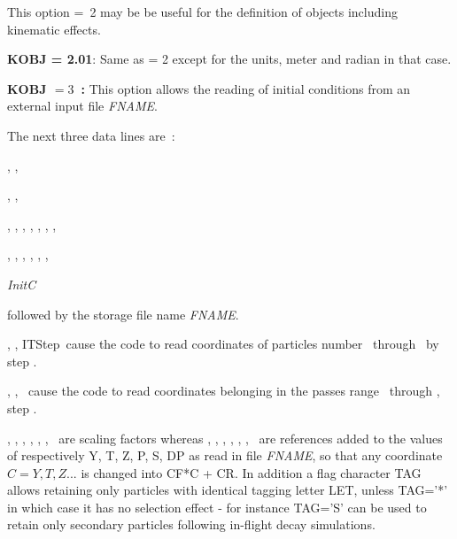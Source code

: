 \smallskip

\noindent This option \mbox{\KOBJ= 2}   may be be useful for the definition of objects including kinematic  effects.  



\bigskip

\noindent\textbf{KOBJ = 2.01}: Same as \KOBJ = 2    except for the units, meter and radian in that case. 




\bigskip




\noindent\textbf{KOBJ $= 3$~:} This option allows the reading of initial conditions from an
external input file \textsl{FNAME}.  

\noindent The next three data lines are~: 

\smallskip 

\ITone, \ITtwo, \ITStep

\IPone, \IPtwo, \IPStep

\YF, \TF, \ZF, \PF, \SF, \DPF, \TiF, \TAG      {} 

\YR, \TR, \ZR, \PR, \SR, \DPR, \TiR

\textsl{InitC}

\smallskip 

\noindent followed by the storage file name \textsl{FNAME}. 

\smallskip 

\noindent \ITone, \ITtwo, ITStep\ cause the code to read coordinates of particles number \ITone\ through  \ITtwo\ by step \ITStep. 

\smallskip 

\noindent \IPone, \IPtwo, \IPStep\  cause the code to read coordinates belonging in the  passes range   
 \IPone\ through  \IPtwo,  step \IPStep. 


\smallskip 

\noindent \YF, \TF, \ZF, \PF, \SF, \DPF, \TiF\ are scaling factors whereas 
 \YR, \TR, \ZR, \PR, \SR, \DPR, \TiR\ are  references added to the  values of respectively Y, T, Z, P, S, DP as read 
in  file \textsl{FNAME}, 
 so that any coordinate $C=Y,T,Z...$ is changed into CF*C + CR. 
In addition a flag character TAG allows retaining only particles with identical tagging letter LET, unless 
TAG='*' in which case it has no selection effect - for instance TAG='S' can be used to retain only secondary 
particles following in-flight decay simulations. 

\smallskip 


